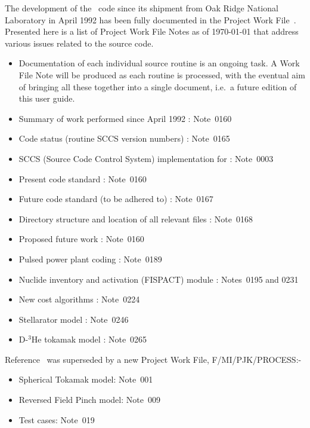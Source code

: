 \label{app:doc}

The development of the \process\ code since its shipment from Oak Ridge
National Laboratory in April 1992 has been fully documented in the
Project Work File~\cite{PWF}. Presented here is a list of Project Work
File Notes as of \today\/ that address various issues related to the
source code.

\begin{itemize}
\item
Documentation of each individual source routine is an ongoing task. A
Work File Note will be produced as each routine is processed, with the
eventual aim of bringing all these together into a single document,
i.e.\ a future edition of this user guide.
\item
Summary of work performed since April 1992 : Note~0160
\item
Code status (routine SCCS version numbers) : Note~0165
\item
SCCS (Source Code Control System) implementation for \process: Note~0003
\item
Present code standard : Note~0160
\item
Future code standard (to be adhered to) : Note~0167
\item
Directory structure and location of all relevant files : Note~0168
\item
Proposed future work : Note~0160
\item
Pulsed power plant coding : Note~0189
\item
Nuclide inventory and activation (FISPACT) module : Notes~0195 and 0231
\item
New cost algorithms : Note~0224
\item
Stellarator model : Note~0246
\item
D-$^3$He tokamak model : Note~0265
\end{itemize}

Reference~\cite{PWF} was superseded by a new Project Work File,
F/MI/PJK/PROCESS:-

\begin{itemize}
\item
Spherical Tokamak model: Note~001

\item
Reversed Field Pinch model: Note~009

\item
Test cases: Note~019

\end{itemize}


